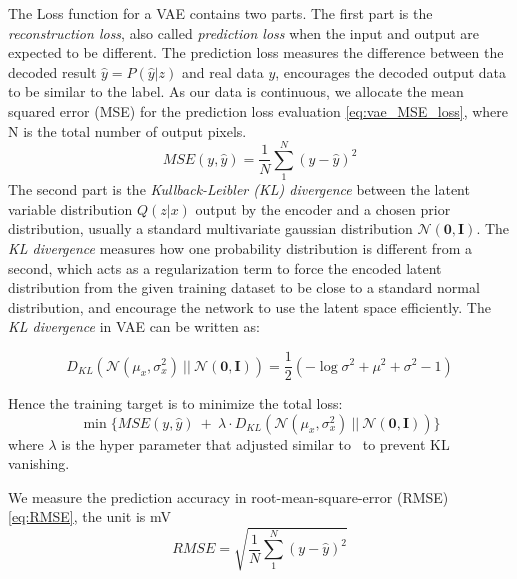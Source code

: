 The Loss function for a VAE contains two parts. The first part is the \textit{reconstruction loss}, also called \textit{prediction loss} when the input and output are expected to be different. The prediction loss measures the difference between the decoded result $\hat{y} = P(\hat{y}|z)$ and real data $y$, encourages the decoded output data to be similar to the label. As our data is continuous, we allocate the mean squared error (MSE) for the prediction loss evaluation \eqref{eq:vae_MSE_loss}, where N is the total number of output pixels.
\begin{equation}
	\label{eq:vae_MSE_loss}
	\textit{MSE}(y, \hat{y}) = \frac{1}{N} \sum_{1}^{N} ( y - \hat{y})^{2}
\end{equation}
The second part is the \textit{Kullback-Leibler (KL) divergence} between the latent variable distribution $Q(z|x)$ output by the encoder and a chosen prior distribution, usually a standard multivariate gaussian distribution $\mathcal{N}(\textbf{0}, \textbf{I})$. The \textit{KL divergence} measures how one probability distribution is different from a second, which acts as a regularization term to force the encoded latent distribution from the given training dataset to be close to a standard normal distribution, and encourage the network to use the latent space efficiently. 
The \textit{KL divergence} in VAE can be written as:

\begin{equation}
	\label{eq:vae_KLD_loss}
	D_{KL}( \mathcal{N}(\mu_{x}, \sigma_{x}^{2}) ~ || ~ \mathcal{N}(\textbf{0}, \textbf{I} ) )  = \dfrac{1}{2} (-\log\sigma^{2} + \mu^{2} + \sigma^{2} - 1)
\end{equation}

Hence the training target is to minimize the total loss:
\begin{equation}
	\label{eq:vae_total_loss}
	\min  \{ \textit{MSE} (y, \hat{y})  ~ + ~ \lambda \cdot D_{KL}( \mathcal{N}(\mu_{x}, \sigma_{x}^{2}) ~ || ~ \mathcal{N}(\textbf{0}, \textbf{I} ) )  \}
\end{equation}
where $\lambda$ is the hyper parameter that adjusted similar to~\cite{Fu:arxiv'19} to prevent KL vanishing.

We measure the prediction accuracy in root-mean-square-error (RMSE)  \eqref{eq:RMSE}, the unit is mV
\begin{equation}
	\label{eq:RMSE}
	\textit{RMSE} =\sqrt{ \frac{1}{N} \sum_{1}^{N} ( y - \hat{y})^{2} }
\end{equation}





